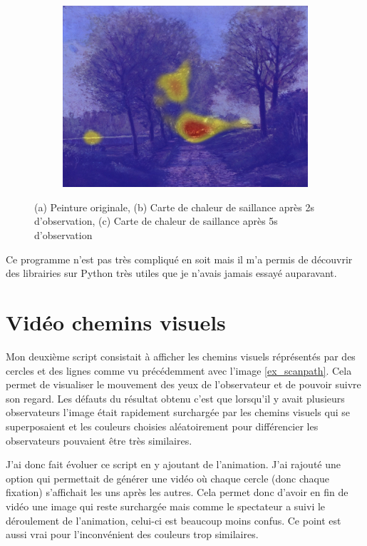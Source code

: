 \begin{figure}[!ht]
\begin{subfigure}{.3\textwidth}
        \includegraphics[width=\linewidth]{datas/fondu_05.jpg}
        \caption{}
    \end{subfigure}
    \caption{(a) Peinture originale, (b) Carte de chaleur de saillance après 2s d'observation, (c) Carte de chaleur de saillance après 5s d'observation}
    \label{fondu}
\end{figure}

\par
Ce programme n'est pas très compliqué en soit mais il m'a permis de découvrir des librairies sur Python très utiles que je n'avais jamais essayé auparavant.

\section{Vidéo chemins visuels}

Mon deuxième script consistait à afficher les chemins visuels réprésentés par des cercles et des lignes comme vu précédemment avec l'image \ref{ex_scanpath}. Cela permet de visualiser le mouvement des yeux de l'observateur et de pouvoir suivre son regard. Les défauts du résultat obtenu c'est que lorsqu'il y avait plusieurs observateurs l'image était rapidement surchargée par les chemins visuels qui se superposaient et les couleurs choisies aléatoirement pour différencier les observateurs pouvaient être très similaires.

\par
J'ai donc fait évoluer ce script en y ajoutant de l'animation. J'ai rajouté une option qui permettait de générer une vidéo où chaque cercle (donc chaque fixation) s'affichait les uns après les autres. Cela permet donc d'avoir en fin de vidéo une image qui reste surchargée mais comme le spectateur a suivi le déroulement de l'animation, celui-ci est beaucoup moins confus. Ce point est aussi vrai pour l'inconvénient des couleurs trop similaires.